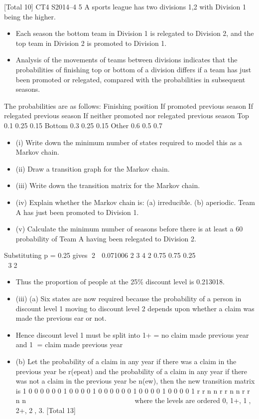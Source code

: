 \documentclass[a4paper,12pt]{article}
\begin{document}
[Total 10]
CT4 S2014–4
5 A sports league has two divisions {1,2} with Division 1 being the higher. 
\begin{itemize}
    \item Each
season the bottom team in Division 1 is relegated to Division 2, and the top team in
Division 2 is promoted to Division 1.
\item Analysis of the movements of teams between divisions indicates that the probabilities
of finishing top or bottom of a division differs if a team has just been promoted or
relegated, compared with the probabilities in subsequent seasons.
\end{itemize}
The probabilities are as follows:
  Finishing
position
If promoted
previous season
If relegated
previous season
If neither promoted
nor relegated
previous season
Top 0.1 0.25 0.15
Bottom 0.3 0.25 0.15
Other 0.6 0.5 0.7
\begin{itemize}
\item (i) Write down the minimum number of states required to model this as a Markov
chain. 
\item (ii) Draw a transition graph for the Markov chain. 
\item (iii) Write down the transition matrix for the Markov chain. 
\item (iv) Explain whether the Markov chain is:
  (a) irreducible.
(b) aperiodic. 
Team A has just been promoted to Division 1.
\item (v) Calculate the minimum number of seasons before there is at least a 60%
probability of Team A having been relegated to Division 2. 
\end{itemize}


Substituting p = 0.25 gives 2  0.071006
2
3 4 2
0.75 0.75
0.25
        
 
 32

\begin{itemize}
    \item 
Thus the proportion of people at the 25\% discount level is 0.213018. 
\item (iii) (a) Six states are now required
because the probability of a person in discount level 1 moving to discount level 2 depends upon whether a claim was made the previous ear or not.
\item Hence discount level 1 must be split into
1+ = no claim made previous year and
1 = claim made previous year
\item (b) Let the probability of a claim in any year if there was a claim in the previous year be r(epeat) and the probability of a claim in any year if there was not a claim in the previous year be n(ew), then the new transition matrix is
1 0 0 0 0
0 0 1 0 0
0 0 1 0 0
0 0 0 0 1
0 0 0 0 1
0 0 0 0 1
r r
n n
r r
n n
r r
n n
  
    
  
 
  
  
    
where the levels are ordered 0, 1+, 1, 2+, 2, 3. 
[Total 13]
\end{itemize}
\end{document}
